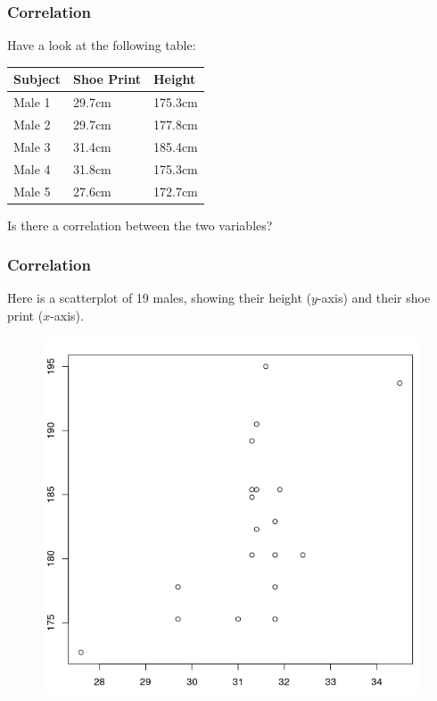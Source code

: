 \documentclass[xcolor=dvipsnames]{beamer}
\begin{document}
\begin{frame}
  \frametitle{Correlation}
  Have a look at the following table:

  \bigskip

  \begin{tabular}{|l|l|l|}\hline
    \textbf{Subject} & \textbf{Shoe Print} & \textbf{Height} \\ \hline
    Male 1 & 29.7cm & 175.3cm \\ \hline
    Male 2 & 29.7cm & 177.8cm \\ \hline
    Male 3 & 31.4cm & 185.4cm \\ \hline
    Male 4 & 31.8cm & 175.3cm \\ \hline
    Male 5 & 27.6cm & 172.7cm \\ \hline
  \end{tabular}

  \bigskip

  Is there a correlation between the two variables?
\end{frame}

\begin{frame}
  \frametitle{Correlation}
  Here is a scatterplot of 19 males, showing their height ($y$-axis)
  and their shoe print ($x$-axis).
  \begin{figure}[h]
    \includegraphics[scale=0.35]{./diagrams/mshoeprintheight.png}
  \end{figure}
\end{frame}
\end{document}
